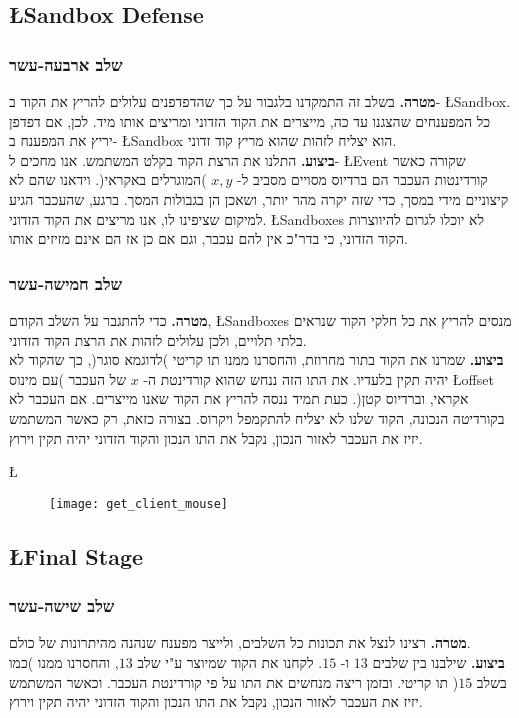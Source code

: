 \documentclass{article}
\newcommand{\goal}{\textbf{מטרה. }}
\newcommand{\action}{\textbf{ביצוע. }}
\begin{document}
			\subsection*{\L{Sandbox Defense}}
			\subsubsection{שלב ארבעה-עשר}
			\goal 
			בשלב זה התמקדנו בלגבור על כך שהדפדפנים עלולים להריץ את הקוד ב- 
			\L{Sandbox}. 
			כל המפענחים שהצגנו עד כה, מייצרים את הקוד הזדוני ומריצים אותו מיד. 
			לכן, אם דפדפן יריץ את המפענח ב- 
			\L{Sandbox} 
			הוא יצליח לזהות שהוא מריץ קוד זדוני.  \\
			\action 
			התלנו את הרצת הקוד בקלט המשתמש. אנו מחכים ל- 
			\L{Event} 
			שקורה כאשר קורדינטות העכבר הם ברדיוס מסויים מסביב ל- $x, y$ )המוגרלים באקראי(. 
			וידאנו שהם לא קיצוניים מידי במסך, כדי שזה יקרה מהר יותר, ושאכן הן בגבולות המסך. 
			ברגע, שהעכבר הגיע למיקום שציפינו לו, אנו מריצים את הקוד הזדוני. 
			\L{Sandboxes} 
			לא יוכלו לגרום להיווצרות הקוד הזדוני, כי בדר"כ אין להם עכבר, 
			וגם אם כן אז הם אינם מזיזים אותו. 
			\subsubsection{שלב חמישה-עשר}
			\goal 
			כדי להתגבר על השלב הקודם, 
			\L{Sandboxes} 
			מנסים להריץ את כל חלקי הקוד שנראים בלתי תלויים, ולכן עלולים לזהות את הרצת הקוד הזדוני. \\
			\action 
			שמרנו את הקוד בתור מחרוזת, והחסרנו ממנו תו קריטי )לדוגמא סוגר(, כך שהקוד לא יהיה תקין בלעדיו.  
			את התו הזה ננחש שהוא קורדינטת ה- $x$ של העכבר )עם מינוס 
			\L{offset} 
			אקראי, וברדיוס קטן(. 
			כעת תמיד ננסה להריץ את הקוד שאנו מייצרים. 
			אם העכבר לא בקורדיטה הנכונה, הקוד שלנו לא יצליח להתקמפל ויקרוס. 
			בצורה כזאת, רק כאשר המשתמש יזיז את העכבר לאזור הנכון, נקבל את התו הנכון והקוד הזדוני יהיה תקין וירוץ. 
			
			\L{\begin{figure}[h]
				\centering
				\texttt{[image: get\_client\_mouse]}
			\end{figure}}
			
			\subsection*{\L{Final Stage}}
			\subsubsection{שלב שישה-עשר}		
			\goal 
			רצינו לנצל את תכונות כל השלבים, ולייצר מפענח שנהנה מהיתרונות של כולם. \\
			\action 
			שילבנו בין שלבים $13$ ו- $15$. 
			לקחנו את הקוד שמיוצר ע"י שלב $13$, והחסרנו ממנו )כמו בשלב $15$( תו קריטי. 
			ובזמן ריצה מנחשים את התו על פי קורדינטת העכבר. 
			וכאשר המשתמש יזיז את העכבר לאזור הנכון, נקבל את התו הנכון והקוד הזדוני יהיה תקין וירוץ. 
\end{document}
